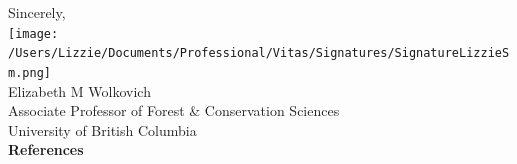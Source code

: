 \documentclass[11pt]{article}
\begin{document}
Sincerely,\\

\texttt{[image: /Users/Lizzie/Documents/Professional/Vitas/Signatures/SignatureLizzieSm.png]} \\

Elizabeth M Wolkovich\\
Associate Professor of Forest \& Conservation Sciences\\ 
University of British Columbia\\

{\bf References}
\vspace{-8ex}

\end{document}
